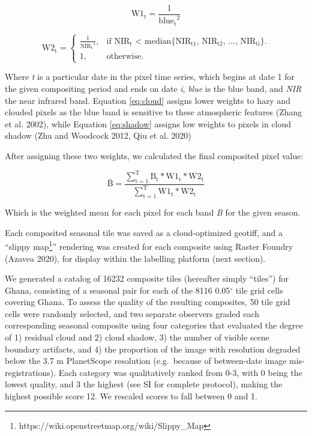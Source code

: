 \documentclass[11pt,a4paper]{article}
\begin{document}
\begin{equation} \label{eq:cloud}
\mathrm{W1_t} = \frac{1}{\mathrm{blue_t}^2}
\end{equation}

\begin{equation} \label{eq:shadow}  
\mathrm{W2_t} =\begin{cases}
    \frac{1}{\mathrm{NIR_t}^4}, & \text{if $\mathrm{NIR_t}$ < median\{$\mathrm{NIR_{t1}}$, $\mathrm{NIR_{t2}}$, ..., $\mathrm{NIR_{ti}}$\}}.\\
    1, & \text{otherwise}.
  \end{cases}
\end{equation}

Where \emph{t} is a particular date in the pixel time series, which
begins at date 1 for the given compositing period and ends on date
\emph{i}, \emph{blue} is the blue band, and \emph{NIR} the near infrared
band. Equation \ref{eq:cloud} assigns lower weights to hazy and clouded
pixels as the blue band is sensitive to these atmospheric features
(Zhang et al. 2002), while Equation \ref{eq:shadow} assigns low weights
to pixels in cloud shadow (Zhu and Woodcock 2012, Qiu et al. 2020)

After assigning these two weights, we calculated the final composited
pixel value:

\begin{equation}
\mathrm{\bar{B} = \frac{\sum_{t=1}^{T}B_t * W1_t * W2_t}{\sum_{t=1}^{T}W1_t * W2_t}}
\end{equation}

Which is the weighted mean for each pixel for each band \emph{B} for the
given season.

Each composited seasonal tile was saved as a cloud-optimized geotiff,
and a ``slippy
map\footnote{https://wiki.openstreetmap.org/wiki/Slippy\_Map}''
rendering was created for each composite using Raster Foundry (Azavea
2020), for display within the labelling platform (next section).

We generated a catalog of 16232 composite tiles (hereafter simply
``tiles'') for Ghana, consisting of a seasonal pair for each of the 8116
0.05\(^\circ\) tile grid cells covering Ghana. To assess the quality of
the resulting composites, 50 tile grid cells were randomly selected, and
two separate observers graded each corresponding seasonal composite
using four categories that evaluated the degree of 1) residual cloud and
2) cloud shadow, 3) the number of visible scene boundary artifacts, and
4) the proportion of the image with resolution degraded below the 3.7 m
PlanetScope resolution (e.g.~because of between-date image
mis-registrations). Each category was qualitatively ranked from 0-3,
with 0 being the lowest quality, and 3 the highest (see SI for complete
protocol), making the highest possible score 12. We rescaled scores to
fall between 0 and 1.
\end{document}
